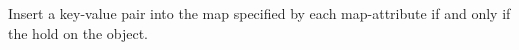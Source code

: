 Insert a key-value pair into the map specified by each map-attribute if and only
if the  hold on the object.




